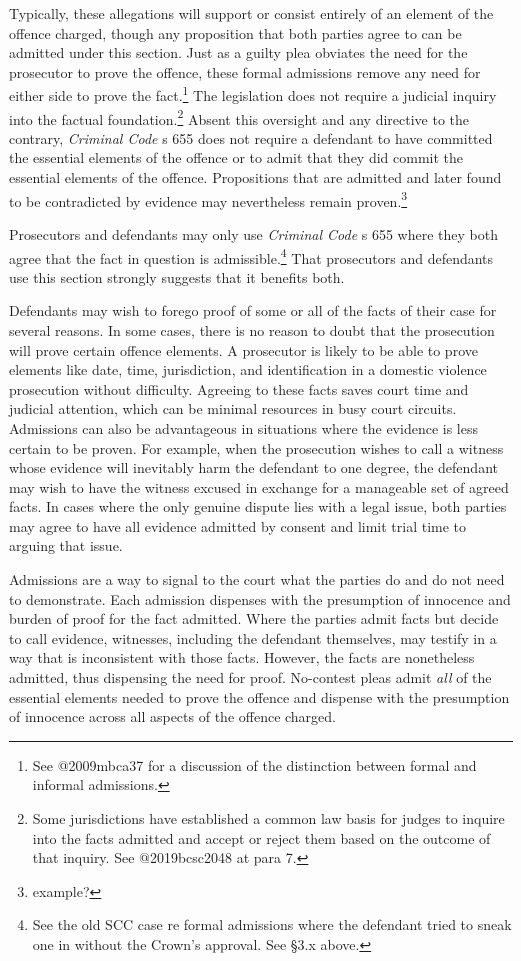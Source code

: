 Typically, these allegations will support or consist entirely of an element of the offence charged, though any proposition that both parties agree to can be admitted under this section. Just as a guilty plea obviates the need for the prosecutor to prove the offence, these formal admissions remove any need for either side to prove the fact.\footnote{See @2009mbca37 for a discussion of the distinction between formal and informal admissions.} The legislation does not require a judicial inquiry into the factual foundation.\footnote{Some jurisdictions have established a common law basis for judges to inquire into the facts admitted and accept or reject them based on the outcome of that inquiry. See @2019bcsc2048 at para 7.} Absent this oversight and any directive to the contrary, \textit{Criminal Code} s 655 does not require a defendant to have committed the essential elements of the offence or to admit that they did commit the essential elements of the offence. Propositions that are admitted and later found to be contradicted by evidence may nevertheless remain proven.\footnote{example?}

Prosecutors and defendants may only use \textit{Criminal Code} s 655 where they both agree that the fact in question is admissible.\footnote{See the old SCC case re formal admissions where the defendant tried to sneak one in without the Crown's approval. See §3.x above.} That prosecutors and defendants use this section strongly suggests that it benefits both.

Defendants may wish to forego proof of some or all of the facts of their case for several reasons. In some cases, there is no reason to doubt that the prosecution will prove certain offence elements. A prosecutor is likely to be able to prove elements like date, time, jurisdiction, and identification in a domestic violence prosecution without difficulty. Agreeing to these facts saves court time and judicial attention, which can be minimal resources in busy court circuits. Admissions can also be advantageous in situations where the evidence is less certain to be proven. For example, when the prosecution wishes to call a witness whose evidence will inevitably harm the defendant to one degree, the defendant may wish to have the witness excused in exchange for a manageable set of agreed facts. In cases where the only genuine dispute lies with a legal issue, both parties may agree to have all evidence admitted by consent and limit trial time to arguing that issue. 

Admissions are a way to signal to the court what the parties do and do not need to demonstrate. Each admission dispenses with the presumption of innocence and burden of proof for the fact admitted. Where the parties admit facts but decide to call evidence, witnesses, including the defendant themselves, may testify in a way that is inconsistent with those facts. However, the facts are nonetheless admitted, thus dispensing the need for proof. No-contest pleas admit \textit{all} of the essential elements needed to prove the offence and dispense with the presumption of innocence across all aspects of the offence charged.

